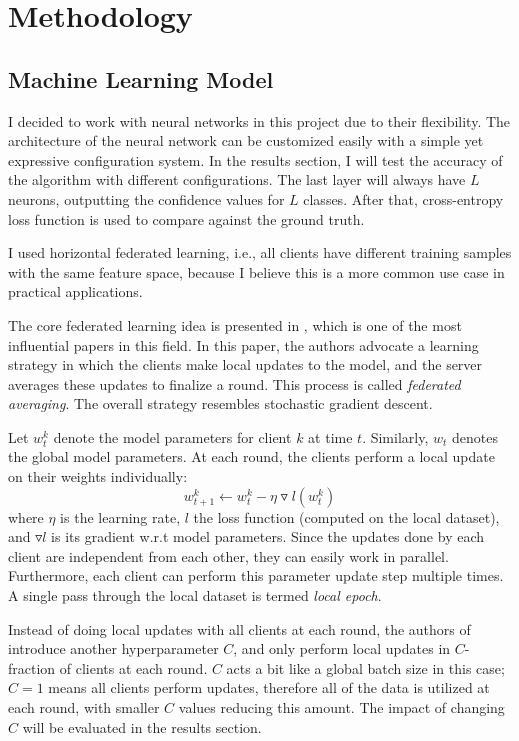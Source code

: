 
\section{Methodology}

\subsection{Machine Learning Model}

I decided to work with neural networks in this project due to their flexibility.
The architecture of the neural network can be customized easily with a simple yet expressive configuration system.
In the results section, I will test the accuracy of the algorithm with different configurations.
The last layer will always have $L$ neurons, outputting the confidence values for $L$ classes.
After that, cross-entropy loss function is used to compare against the ground truth.

I used horizontal federated learning, i.e., all clients have different training samples with the same feature space, because I believe this is a more common use case in practical applications.

The core federated learning idea is presented in \cite{comef-FL}, which is one of the most influential papers in this field.
In this paper, the authors advocate a learning strategy in which the clients make local updates to the model, and the server averages these updates to finalize a round.
This process is called \textit{federated averaging}.
The overall strategy resembles stochastic gradient descent.

Let $w^k_t$ denote the model parameters for client $k$ at time $t$.
Similarly, $w_t$ denotes the global model parameters.
At each round, the clients perform a local update on their weights individually:
\begin{equation}
    w^k_{t+1} \leftarrow w^k_{t} - \eta \triangledown l(w^k_t)
\end{equation}
where $\eta$ is the learning rate, $l$ the loss function (computed on the local dataset), and $\triangledown l$ is its gradient w.r.t model parameters.
Since the updates done by each client are independent from each other, they can easily work in parallel.
Furthermore, each client can perform this parameter update step multiple times.
A single pass through the local dataset is termed \textit{local epoch}.

Instead of doing local updates with all clients at each round, the authors of \citep{comef-FL} introduce another hyperparameter $C$, and only perform local updates in $C$-fraction of clients at each round.
$C$ acts a bit like a global batch size in this case; $C = 1$ means all clients perform updates, therefore all of the data is utilized at each round, with smaller $C$ values reducing this amount.
The impact of changing $C$ will be evaluated in the results section.

